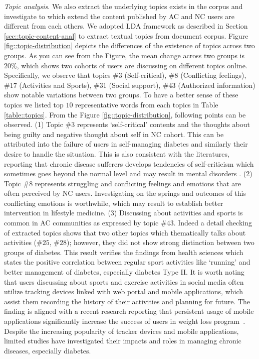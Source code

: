 \documentclass{acm_proc_article-sp}
\begin{document}
\emph{Topic analysis}. We also extract the underlying topics exists in the corpus and investigate to which extend the content published by AC and NC users are different from each others. We adopted LDA framework as described in Section \ref{sec::topic-content-anal} to extract textual topics from document corpus. Figure \ref{fig::topic-distribution} depicts the differences of the existence of topics across two groups. As you can see from the Figure, the mean change across two groups is $20\%$, which shows two cohorts of users are discussing on different topics online. Specifically, we observe that topics $\#3$ (Self-critical), $\#8$ (Conflicting feelings), $\#17$ (Activities and Sports), $\#31$ (Social support), $\#43$ (Authorized information) show notable variations between two groups. To have a better sense of these topics we listed top $10$ representative words from each topics in Table \ref{table::topics}.  From the Figure \ref{fig::topic-distribution}, following points can be observed. (1) Topic $\#3$ represents `self-critical' contents and the thoughts about being guilty and negative thought about self in NC cohort. This can be attributed into the failure of users in self-managing diabetes and similarly their desire to handle the situation. This is also consistent with the literatures, reporting that chronic disease sufferers develops tendencies of self-criticism which sometimes goes beyond the normal level and may result in mental disorders \cite{anderson2001prevalence,katon1990depression}. (2) Topic $\#8$ represents struggling and conflicting feelings and emotions that are often perceived by NC users. Investigating on the springs and outcomes of this conflicting emotions is worthwhile, which may result to establish better intervention in lifestyle medicine. (3) Discussing about activities and sports is common in AC communities as expressed by topic $\#43$. Indeed a detail checking of extracted topics shows that two other topics which thematically talks about activities ($\#25$, $\#28$); however, they did not show strong distinction between two groups of diabetes. This result verifies the findings from health sciences which states the positive correlation between regular sport activities like `running' and better management of diabetes, especially diabetes Type II\cite{klein2004weight}. It is worth noting that users discussing about sports and exercise activities in social media often utilize tracking devices linked with web portal and mobile applications, which assist them recording the history of their activities and planning for future. The finding is aligned with a recent research reporting that persistent usage of mobile applications significantly increase the success of users in weight loss program~\cite{park2015persistent}. Despite the increasing popularity of tracker devices and mobile applications, limited studies have investigated their impacts and roles in managing chronic diseases, especially diabetes.
\end{document}
